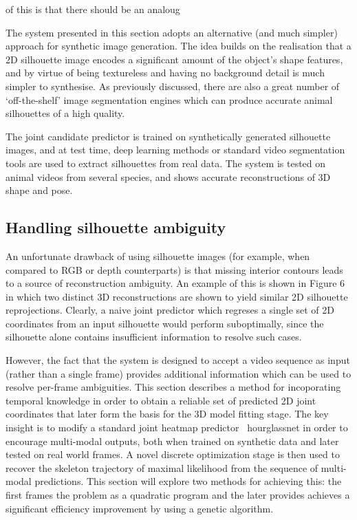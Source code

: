 of this is that there should be an analoug%

The system presented in this section adopts an alternative (and much simpler) approach for synthetic image generation. The idea builds on the realisation that a 2D silhouette image encodes a significant amount of the object's shape features, and by virtue of being textureless and having no background detail is much simpler to synthesise. As previously discussed, there are also a great number of `off-the-shelf' image segmentation engines which can produce accurate animal silhouettes of a high quality. 

The joint candidate predictor is trained on synthetically generated silhouette images, and at test time, deep learning methods or standard video segmentation tools are used to extract silhouettes from real data. The system is tested on animal videos from several species, and shows accurate reconstructions of 3D shape and pose.


\subsection{Handling silhouette ambiguity}

An unfortunate drawback of using silhouette images (for example, when compared to RGB or depth counterparts) is that missing interior contours leads to a source of reconstruction ambiguity. An example of this is shown in Figure 6 in which two distinct 3D reconstructions are shown to yield similar 2D silhouette reprojections. Clearly, a naive joint predictor which regreses a single set of 2D coordinates from an input silhouette would perform suboptimally, since the silhouette alone contains insufficient information to resolve such cases. 

However, the fact that the system is designed to accept a video sequence as input (rather than a single frame) provides additional information which can be used to resolve per-frame ambiguities. This section describes a method for incoporating temporal knowledge in order to obtain a reliable set of predicted 2D joint coordinates that later form the basis for the 3D model fitting stage. The key insight is to modify a standard joint heatmap predictor~ {hourglassnet} in order to encourage multi-modal outputs, both when trained on synthetic data and later tested on real world frames. A novel discrete optimization stage is then used to recover the skeleton trajectory of maximal likelihood from the sequence of multi-modal predictions. This section will explore two methods for achieving this: the first frames the problem as a quadratic program and the later provides achieves a significant efficiency improvement by using a genetic algorithm. 


